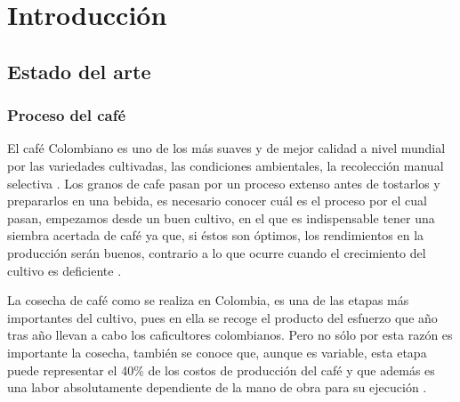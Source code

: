 \cleardoublepage %






\chapter{Introducción}\label{sec:capitulo1}

\section{Estado del arte}
\subsection{Proceso del café}

El café Colombiano es uno de los más suaves y de mejor calidad a nivel mundial por las variedades cultivadas, las condiciones ambientales, la recolección manual selectiva \citep{Calidadd}. Los granos de cafe pasan por un proceso extenso antes de tostarlos y prepararlos en una bebida, es necesario conocer cuál es el proceso por el cual pasan, empezamos desde un buen cultivo, en el que es indispensable tener una siembra acertada de café ya que, si éstos son óptimos, los rendimientos en la producción serán buenos, contrario a lo que ocurre cuando el crecimiento del cultivo es deficiente \citep{Crecimiento}.\medskip 

La cosecha de café como se realiza en Colombia, es una de las etapas más importantes del cultivo, pues en ella se recoge el producto del esfuerzo que año tras año llevan a cabo los caficultores colombianos. Pero no sólo por esta razón es importante la cosecha, también se conoce que, aunque es variable, esta etapa puede representar el 40\% de los costos de producción del café y que además es una labor absolutamente dependiente de la mano de obra para su ejecución \citep{Cosecha}.\medskip

